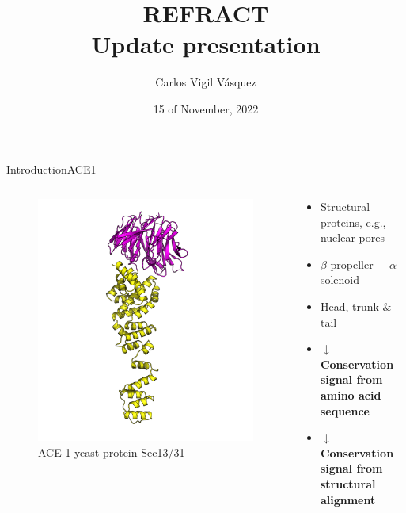 \documentclass{beamer}
\title{REFRACT\\Update presentation}
\author{Carlos Vigil Vásquez}
\institute{$\mu$Platypus Lab, CABD. Sevilla, Spain.}
\date{15 of November, 2022}
\begin{document}
\frame{\titlepage}

\begin{frame}{Introduction}{ACE1}
	\begin{columns}
		\begin{column}{0.5\linewidth}
			\begin{figure}
				\includegraphics[width=\linewidth]{figures/ACE1_example.png}
				\caption{ACE-1 yeast protein Sec13/31}
			\end{figure}
		\end{column}
		\begin{column}{0.5\linewidth}
			\begin{itemize}
				\item Structural proteins, e.g., nuclear pores \pause
				\item $\beta$ propeller + $\alpha$-solenoid \pause
				\item Head, trunk \& tail \pause
				\item \textbf{$\downarrow$ Conservation signal from amino acid sequence}
				\item \textbf{$\downarrow$ Conservation signal from structural alignment}
			\end{itemize}
		\end{column}
	\end{columns}
\end{frame}
\end{document}
